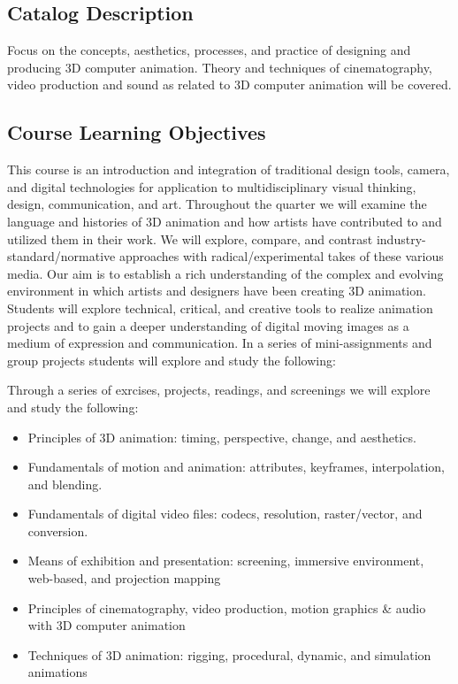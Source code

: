 \subsection{Catalog Description}

Focus on the concepts, aesthetics, processes, and practice of designing and producing 3D computer animation. Theory and techniques of cinematography, video production and sound as related to 3D computer animation will be covered.

\subsection{Course Learning Objectives}

This course is an introduction and integration of traditional design tools, camera, and digital technologies for application to multidisciplinary visual thinking, design, communication, and art. Throughout the quarter we will examine the language and histories of 3D animation and how artists have contributed to and utilized them in their work. We will explore, compare, and contrast industry-standard/normative approaches with radical/experimental takes of these various media. Our aim is to establish a rich understanding of the complex and evolving environment in which artists and designers have been creating 3D animation. Students will explore technical, critical, and creative tools to realize animation projects and to gain a deeper understanding of digital moving images as a medium of expression and communication. In a series of mini-assignments and group projects students will explore and study the following:

Through a series of exrcises, projects, readings, and screenings we will explore and study the following:
\begin{itemize}
      \tightlist
      \item Principles of 3D animation: timing, perspective, change, and aesthetics.
      \item Fundamentals of motion and animation: attributes, keyframes, interpolation, and blending.
      \item Fundamentals of digital video files: codecs, resolution, raster/vector, and conversion.
      \item Means of exhibition and presentation: screening, immersive environment, web-based, and projection mapping
      \item Principles of cinematography, video production, motion graphics \& audio with 3D computer animation
      \item Techniques of 3D animation: rigging, procedural, dynamic, and simulation animations
\end{itemize}

